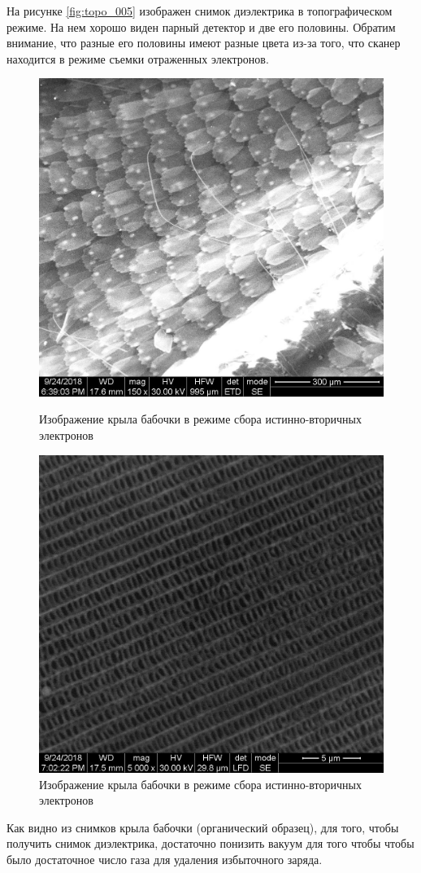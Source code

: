 \documentclass[a4paper, 12pt]{article}
\begin{document}
	На рисунке \ref{fig:topo_005} изображен снимок диэлектрика в топографическом режиме. На нем хорошо виден парный детектор и две его половины. Обратим внимание, что разные его половины имеют разные цвета из-за того, что сканер находится в режиме съемки отраженных электронов.\par
	\begin{figure}[!htb]
		\includegraphics[width=\linewidth]{iv_011.jpg}
		\caption{Изображение крыла бабочки в режиме сбора истинно-вторичных электронов}
		\endminipage\hfill
		\includegraphics[width=\linewidth]{iv_013.jpg}
		\caption{Изображение крыла бабочки в режиме сбора истинно-вторичных электронов}
		\endminipage
	\end{figure}
	Как видно из снимков крыла бабочки (органический образец), для того, чтобы получить снимок диэлектрика, достаточно понизить вакуум для того чтобы чтобы было достаточное число газа для удаления избыточного заряда.
	\newpage
\end{document}

